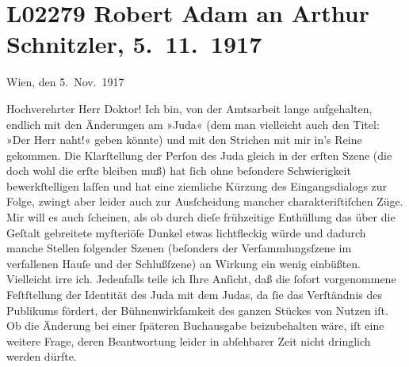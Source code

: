 

\section[Robert Adam an Arthur Schnitzler, 5. 11. 1917]{L02279 Robert Adam an Arthur Schnitzler, 5. 11. 1917}
\nopagebreak{}
\rehead{ }\normalsize\beginnumbering{}
\toendnotes[C]{\smallbreak\pagebreak[2]}
\pstart
           \raggedleft{}{\pb}Wien, den 5. Nov. 1917\pend
           
\pstart\center{}Hochverehrter Herr Doktor!\pend\vspace{0.5em}
\pstart
           Ich bin, von der Amtsarbeit lange aufgehalten, endlich mit den Änderungen am »Juda« (dem man vielleicht auch den Titel: »Der
               Herr naht!« geben könnte) und mit den Strichen mit mir in’s Reine gekommen. Die
               Klarſtellung der Perſon des Juda gleich in der erſten Szene (die doch wohl die erſte
               bleiben muß) hat ſich ohne beſondere Schwierigkeit bewerkſtelligen laſſen und hat
               eine ziemliche Kürzung des Eingangsdialogs zur Folge, zwingt aber leider auch zur
               Ausſcheidung mancher charakteriſtiſchen Züge. Mir will es auch ſcheinen,  als ob durch dieſe frühzeitige Enthüllung das über
               die Geſtalt gebreitete myſteriöſe Dunkel etwas lichtfleckig würde und  dadurch manche Stellen folgender Szenen (beſonders
               der Verſammlungsſzene im verfallenen Hauſe und der Schlußſzene) {\pb}an Wirkung ein wenig einbüßten. Vielleicht
               irre ich. Jedenfalls teile ich Ihre Anſicht, daß die ſofort vorgenommene Feſtſtellung
               der Identität des Juda mit dem Judas, da ſie das Verſtändnis des Publikums fördert,
               der Bühnenwirkſamkeit des ganzen Stückes von Nutzen iſt. Ob die Änderung bei einer
               ſpäteren Buchausgabe beizubehalten wäre, iſt eine weitere Frage, deren Beantwortung
               leider in abſehbarer Zeit nicht dringlich werden dürfte.\pend
           
